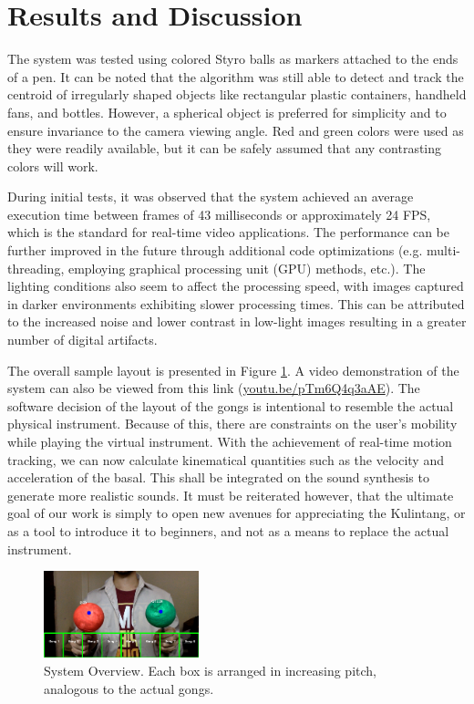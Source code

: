 \documentclass[10pt,a4paper,twoside]{article}
\begin{document}
\section{Results and Discussion}
The system was tested using colored Styro balls as markers attached to the ends of a pen. It can be noted that the algorithm was still able to detect and track the centroid of irregularly shaped objects like rectangular plastic containers, handheld fans, and  bottles. However, a spherical object is preferred for simplicity and to ensure invariance to the camera viewing angle. Red and green colors were used as they were readily available, but it can be safely assumed that any contrasting colors will work. 

During initial tests, it was observed that the system achieved an average execution time between frames of 43 milliseconds or approximately 24 FPS, which is the standard for real-time video applications. The performance can be further improved in the future through additional code optimizations (e.g. multi-threading, employing graphical processing unit (GPU) methods, etc.). The lighting conditions also seem to affect the processing speed, with images captured in darker environments exhibiting slower processing times. This can be attributed to the increased noise and lower contrast in low-light images resulting in a greater number of digital artifacts. 

The overall sample layout is presented in Figure \ref{fig:system}. A video demonstration of the system can also be viewed from this link (\href{https://youtu.be/pTm6Q4q3aAE}{youtu.be/pTm6Q4q3aAE}). The software decision of the layout of the gongs is intentional to resemble the actual physical instrument. Because of this, there are constraints on the user's mobility while playing the virtual instrument. With the achievement of real-time motion tracking, we can now calculate kinematical quantities such as the velocity and acceleration of the basal. This shall be integrated on the sound synthesis to generate more realistic sounds. It must be reiterated  however, that the ultimate goal of our work is simply to open new avenues for appreciating the Kulintang, or as a tool to introduce it to beginners, and not as a means to replace the actual instrument.

\begin{figure}[h!]
  \centering
  \includegraphics[width=0.40\textwidth]{system.png}
  \caption{System Overview. Each box is arranged in increasing pitch, analogous to the actual gongs.}
  \label{fig:system}
\end{figure}
\end{document}
